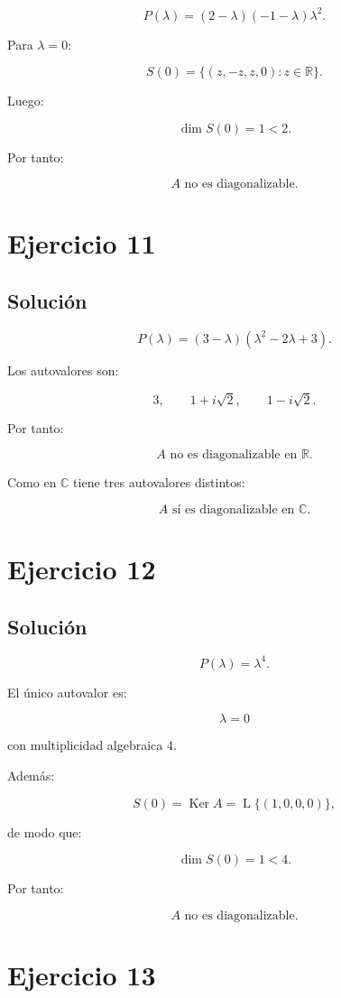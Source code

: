 \documentclass[11pt,a4paper]{article}
\newcommand{\R}{\mathbb{R}}
\newcommand{\C}{\mathbb{C}}
\newcommand{\Ker}{\operatorname{Ker}}
\newcommand{\Span}{\operatorname{L}}
\begin{document}
\[
P(\lambda)
=
(2-\lambda)(-1-\lambda)\lambda^2.
\]

Para $\lambda=0$:

\[
S(0)
=
\{(z,-z,z,0):z\in\R\}.
\]

Luego:

\[
\dim S(0)=1<2.
\]

Por tanto:

\[
\boxed{
A\text{ no es diagonalizable.}
}
\]

\section{Ejercicio 11}
\subsection{Solución}

\[
P(\lambda)
=
(3-\lambda)(\lambda^2-2\lambda+3).
\]

Los autovalores son:

\[
3,\qquad
1+i\sqrt2,\qquad
1-i\sqrt2.
\]

Por tanto:

\[
\boxed{
A\text{ no es diagonalizable en }\R.
}
\]

Como en $\C$ tiene tres autovalores distintos:

\[
\boxed{
A\text{ sí es diagonalizable en }\C.
}
\]

\section{Ejercicio 12}
\subsection{Solución}

\[
P(\lambda)=\lambda^4.
\]

El único autovalor es:

\[
\lambda=0
\]

con multiplicidad algebraica $4$.

Además:

\[
S(0)
=
\Ker A
=
\Span\{(1,0,0,0)\},
\]

de modo que:

\[
\dim S(0)=1<4.
\]

Por tanto:

\[
\boxed{
A\text{ no es diagonalizable.}
}
\]

\section{Ejercicio 13}
\end{document}
